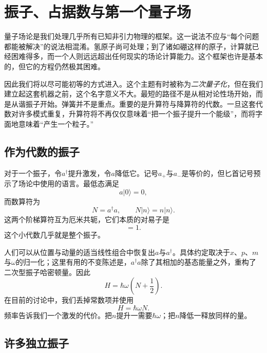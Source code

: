 \chapter{振子、占据数与第一个量子场}

量子场论是我们处理几乎所有已知非引力物理的框架。这一说法不应与“每个问题都能被解决”的说法相混淆。氢原子尚可处理；到了诸如硼这样的原子，计算就已经困难得多，而一个人则远远超出任何现实的场论计算能力。这个框架也许是基本的，但它的方程仍然极其困难。

因此我们将以尽可能初等的方式进入。这个主题有时被称为\emph{二次量子化}，但在我们建立起这套机器之前，这个名字意义不大。最短的路径不是从相对论性场开始，而是从谐振子开始。弹簧并不是重点。重要的是升算符与降算符的代数。一旦这套代数对许多模式重复，升算符将不再仅仅意味着``把一个振子提升一个能级''，而将字面地意味着``产生一个粒子。''

\section{作为代数的振子}

对于一个振子，令\(a^\dagger\)提升激发，令\(a\)降低它。记号\(a_+\)与\(a_-\)是等价的，但匕首记号预示了场论中使用的语言。最低态满足
\begin{equation}
a|0\rangle=0,
\end{equation}
而数算符为
\begin{equation}
N=a^\dagger a,
\qquad
N|n\rangle=n|n\rangle.
\end{equation}
这两个阶梯算符互为厄米共轭，它们本质的对易子是
\begin{equation}
[a,a^\dagger]=1.
\label{eq:l06-single-commutator}
\end{equation}
这个小代数几乎就是整个振子。

人们可以从位置与动量的适当线性组合中恢复出\(a\)与\(a^\dagger\)。具体约定取决于\(x\)、\(p\)、\(m\)与\(\omega\)的归一化；这里有用的不变陈述是，\(a^\dagger a\)除了其相加的基态能量之外，重构了二次型振子哈密顿量。因此
\begin{equation}
H=\hbar\omega\left(N+\frac12\right).
\end{equation}
在目前的讨论中，我们丢掉常数项并使用
\begin{equation}
H=\hbar\omega N.
\label{eq:l06-one-oscillator-hamiltonian}
\end{equation}
频率告诉我们一个激发的代价。把\(n\)提升一需要\(\hbar\omega\)；把\(n\)降低一释放同样的量。

\section{许多独立振子}


